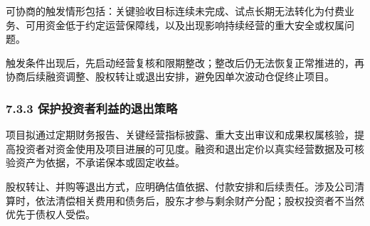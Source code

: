 可协商的触发情形包括：关键验收目标连续未完成、试点长期无法转化为付费业务、可用资金低于约定运营保障线，以及出现影响持续经营的重大安全或权属问题。

触发条件出现后，先启动经营复核和限期整改；整改后仍无法恢复正常推进的，再协商后续融资调整、股权转让或退出安排，避免因单次波动仓促终止项目。

\subsubsection{7.3.3 保护投资者利益的退出策略}\label{ux4fddux62a4ux6295ux8d44ux8005ux5229ux76caux7684ux9000ux51faux7b56ux7565}

项目拟通过定期财务报告、关键经营指标披露、重大支出审议和成果权属核验，提高投资者对资金使用及项目进展的可见度。融资和退出定价以真实经营数据及可核验资产为依据，不承诺保本或固定收益。

股权转让、并购等退出方式，应明确估值依据、付款安排和后续责任。涉及公司清算时，依法清偿相关费用和债务后，股东才参与剩余财产分配；股权投资者不当然优先于债权人受偿。

